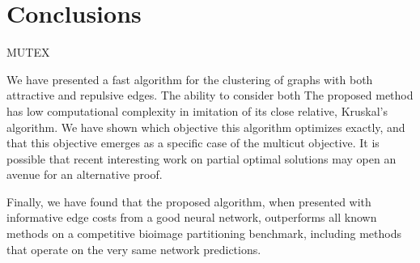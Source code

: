 

\chapter*{Conclusions}

MUTEX

We have presented a fast algorithm for the clustering of graphs with both attractive and repulsive edges. The ability to consider both
The proposed method has low computational complexity in imitation of its close relative, Kruskal's algorithm. We have shown which objective this algorithm optimizes exactly, and that this objective emerges as a specific case of the multicut objective. It is possible that recent interesting work \cite{lange2018partial} on partial optimal solutions may open an avenue for an alternative proof.


Finally, we have found that the proposed algorithm, when presented with informative edge costs from a good neural network, outperforms all known methods on a competitive bioimage partitioning benchmark, including methods that operate on the very same network predictions. 
